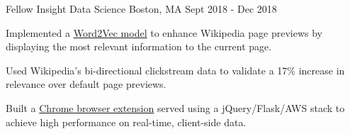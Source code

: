 \begin{cventries}
  \cventry
    {Fellow} %
    {Insight Data Science} %
    {Boston, MA} %
    {Sept 2018 - Dec 2018} %
    {
      \begin{cvitems} %
        \item {Implemented a \href{https://github.com/knowbodynos/wikontext}{Word2Vec model} to enhance Wikipedia page previews by displaying the most relevant information to the current page.}
        \item {Used Wikipedia's bi-directional clickstream data to validate a 17\% increase in relevance over default page previews.}
        \item {Built a \href{https://www.wikontext.us/}{Chrome browser extension} served using a jQuery/Flask/AWS stack to achieve high performance on real-time, client-side data.}
      \end{cvitems}
    }


\end{cventries}
